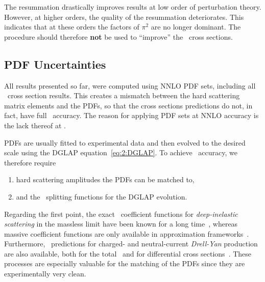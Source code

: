 The resummation drastically improves results at low order of perturbation theory. However, at higher orders, the quality of the resummation deteriorates. This indicates that at these orders the factors of $\pi^2$ are no longer dominant. The procedure should therefore \textbf{not} be used to ``improve'' the \NNNLO\ cross sections.

\subsection{PDF Uncertainties} \label{subsec:4:pdf_uncertainties}
All results presented so far, were computed using \acs{NNLO} \acs{PDF} sets, including all \NNNLO\ cross section results. This creates a mismatch between the hard scattering matrix elements and the \acs{PDF}s, so that the cross sections predictions do not, in fact, have full \NNNLO\ accuracy. The reason for applying \acs{PDF} sets at \acs{NNLO} accuracy is the lack thereof at \NNNLO.

\acs{PDF}s are usually fitted to experimental data and then evolved to the desired scale using the DGLAP equation~\eqref{eq:2:DGLAP}. To achieve \NNNLO\ accuracy, we therefore require
\begin{enumerate}
  \item hard scattering amplitudes the \acs{PDF}s can be matched to,
  \item and the \NNNLO\ splitting functions for the DGLAP evolution.
\end{enumerate}
Regarding the first point, the exact \NNNLO\ coefficient functions for \textit{deep-inelastic scattering} in the massless limit have been known for a long time~\cite{Vermaseren:2005qc, Moch:2004xu, Moch:2007rq, Moch:2008fj, Davies:2016ruz, Blumlein:2022gpp}, whereas massive coefficient functions are only available in approximation frameworks~\cite{Kawamura:2012cr, Laurenti:2024anf}. Furthermore, \NNNLO\ predictions for charged- and neutral-current \textit{Drell-Yan} production are also available, both for the total~\cite{Baglio:2022wzu, Duhr:2020sdp, Duhr:2021vwj} and for differential cross sections~\cite{Chen:2021vtu, Chen:2022lwc}. These processes are especially valuable for the matching of the \acs{PDF}s since they are experimentally very clean.


